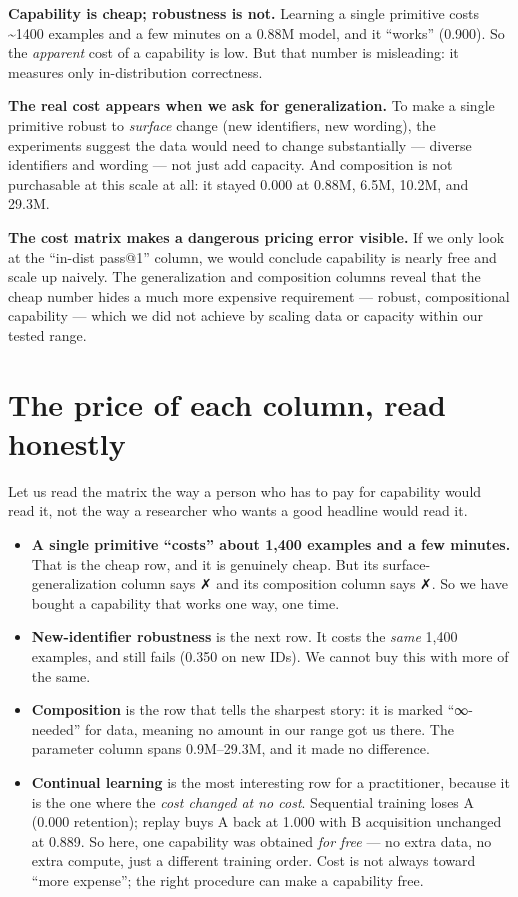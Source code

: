 \textbf{Capability is cheap; robustness is not.} Learning a single
primitive costs \textasciitilde1400 examples and a few minutes on a
0.88M model, and it ``works'' (0.900). So the \emph{apparent} cost of a
capability is low. But that number is misleading: it measures only
in-distribution correctness.

\textbf{The real cost appears when we ask for generalization.} To make a
single primitive robust to \emph{surface} change (new identifiers, new
wording), the experiments suggest the data would need to change
substantially --- diverse identifiers and wording --- not just add
capacity. And composition is not purchasable at this scale at all: it
stayed 0.000 at 0.88M, 6.5M, 10.2M, and 29.3M.

\textbf{The cost matrix makes a dangerous pricing error visible.} If we
only look at the ``in-dist pass@1'' column, we would conclude capability
is nearly free and scale up naively. The generalization and composition
columns reveal that the cheap number hides a much more expensive
requirement --- robust, compositional capability --- which we did not
achieve by scaling data or capacity within our tested range.

\section{The price of each column, read
honestly}\label{the-price-of-each-column-read-honestly}

Let us read the matrix the way a person who has to pay for capability
would read it, not the way a researcher who wants a good headline would
read it.

\begin{itemize}
\tightlist
\item
  \textbf{A single primitive ``costs'' about 1,400 examples and a few
  minutes.} That is the cheap row, and it is genuinely cheap. But its
  surface-generalization column says ✗ and its composition column says
  ✗. So we have bought a capability that works one way, one time.
\item
  \textbf{New-identifier robustness} is the next row. It costs the
  \emph{same} 1,400 examples, and still fails (0.350 on new IDs). We
  cannot buy this with more of the same.
\item
  \textbf{Composition} is the row that tells the sharpest story: it is
  marked ``∞-needed'' for data, meaning no amount in our range got us
  there. The parameter column spans 0.9M--29.3M, and it made no
  difference.
\item
  \textbf{Continual learning} is the most interesting row for a
  practitioner, because it is the one where the \emph{cost changed at no
  cost}. Sequential training loses A (0.000 retention); replay buys A
  back at 1.000 with B acquisition unchanged at 0.889. So here, one
  capability was obtained \emph{for free} --- no extra data, no extra
  compute, just a different training order. Cost is not always toward
  ``more expense''; the right procedure can make a capability free.
\end{itemize}


